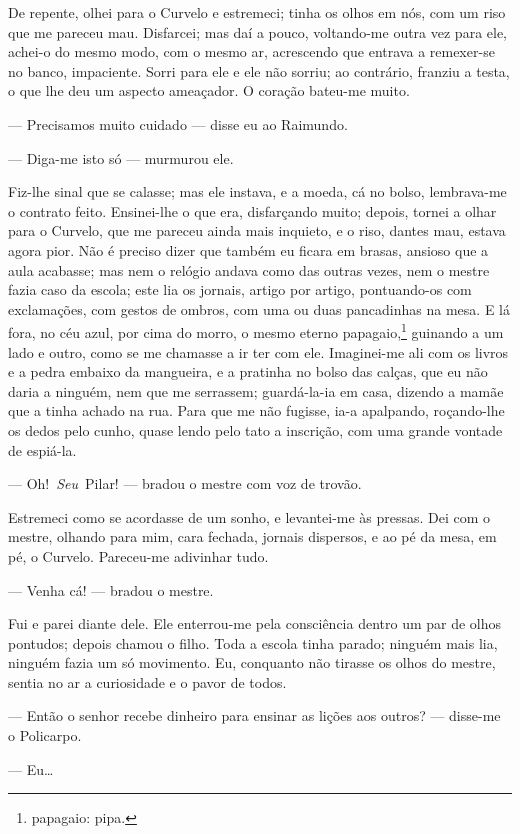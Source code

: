 De repente, olhei para o Curvelo e estremeci; tinha os olhos em nós, com
um riso que me pareceu mau. Disfarcei; mas daí a pouco, voltando-me
outra vez para ele, achei-o do mesmo modo, com o mesmo ar, acrescendo
que entrava a remexer-se no banco, impaciente. Sorri para ele e ele não
sorriu; ao contrário, franziu a testa, o que lhe deu um aspecto
ameaçador. O coração bateu-me muito.

--- Precisamos muito cuidado --- disse eu ao Raimundo.

--- Diga-me isto só --- murmurou ele.

Fiz-lhe sinal que se calasse; mas ele instava, e a moeda, cá no bolso,
lembrava-me o contrato feito. Ensinei-lhe o que era, disfarçando muito;
depois, tornei a olhar para o Curvelo, que me pareceu ainda mais
inquieto, e o riso, dantes mau, estava agora pior. Não é preciso dizer
que também eu ficara em brasas, ansioso que a aula acabasse; mas nem o
relógio andava como das outras vezes, nem o mestre fazia caso da escola;
este lia os jornais, artigo por artigo, pontuando-os com exclamações,
com gestos de ombros, com uma ou duas pancadinhas na mesa. E lá fora, no
céu azul, por cima do morro, o mesmo eterno papagaio,\footnote{papagaio:
  pipa.} guinando a um lado e outro, como se me chamasse a ir ter com
ele. Imaginei-me ali com os livros e a pedra embaixo da mangueira, e a
pratinha no bolso das calças, que eu não daria a ninguém, nem que me
serrassem; guardá-la-ia em casa, dizendo a mamãe que a tinha achado na
rua. Para que me não fugisse, ia-a apalpando, roçando-lhe os dedos pelo
cunho, quase lendo pelo tato a inscrição, com uma grande vontade de
espiá-la.

--- Oh!~\emph{Seu}~Pilar! --- bradou o mestre com voz de trovão.

Estremeci como se acordasse de um sonho, e levantei-me às pressas. Dei
com o mestre, olhando para mim, cara fechada, jornais dispersos, e ao pé
da mesa, em pé, o Curvelo. Pareceu-me adivinhar tudo.

--- Venha cá! --- bradou o mestre.

Fui e parei diante dele. Ele enterrou-me pela consciência dentro um par
de olhos pontudos; depois chamou o filho. Toda a escola tinha parado;
ninguém mais lia, ninguém fazia um só movimento. Eu, conquanto não
tirasse os olhos do mestre, sentia no ar a curiosidade e o pavor de
todos.

--- Então o senhor recebe dinheiro para ensinar as lições aos outros?
--- disse-me o Policarpo.

--- Eu\ldots{}

